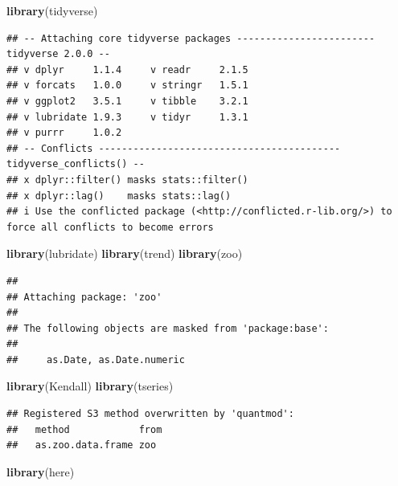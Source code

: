 \documentclass[
]{article}
\newenvironment{Shaded}{\begin{snugshade}}{\end{snugshade}}
\newcommand{\FunctionTok}[1]{\textcolor[rgb]{0.13,0.29,0.53}{\textbf{#1}}}
\newcommand{\NormalTok}[1]{#1}
\begin{document}
\begin{Shaded}
\begin{Highlighting}[]
\FunctionTok{library}\NormalTok{(tidyverse)}
\end{Highlighting}
\end{Shaded}

\begin{verbatim}
## -- Attaching core tidyverse packages ------------------------ tidyverse 2.0.0 --
## v dplyr     1.1.4     v readr     2.1.5
## v forcats   1.0.0     v stringr   1.5.1
## v ggplot2   3.5.1     v tibble    3.2.1
## v lubridate 1.9.3     v tidyr     1.3.1
## v purrr     1.0.2     
## -- Conflicts ------------------------------------------ tidyverse_conflicts() --
## x dplyr::filter() masks stats::filter()
## x dplyr::lag()    masks stats::lag()
## i Use the conflicted package (<http://conflicted.r-lib.org/>) to force all conflicts to become errors
\end{verbatim}

\begin{Shaded}
\begin{Highlighting}[]
\FunctionTok{library}\NormalTok{(lubridate)}
\FunctionTok{library}\NormalTok{(trend)}
\FunctionTok{library}\NormalTok{(zoo)}
\end{Highlighting}
\end{Shaded}

\begin{verbatim}
## 
## Attaching package: 'zoo'
## 
## The following objects are masked from 'package:base':
## 
##     as.Date, as.Date.numeric
\end{verbatim}

\begin{Shaded}
\begin{Highlighting}[]
\FunctionTok{library}\NormalTok{(Kendall)}
\FunctionTok{library}\NormalTok{(tseries)}
\end{Highlighting}
\end{Shaded}

\begin{verbatim}
## Registered S3 method overwritten by 'quantmod':
##   method            from
##   as.zoo.data.frame zoo
\end{verbatim}

\begin{Shaded}
\begin{Highlighting}[]
\FunctionTok{library}\NormalTok{(here)}
\end{Highlighting}
\end{Shaded}
\end{document}
